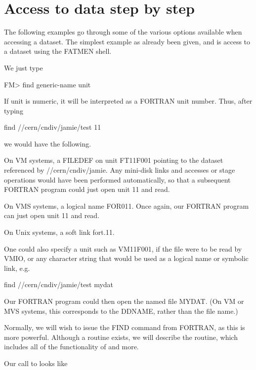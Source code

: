 \section{Access to data step by step}
\par
The following examples go through some of the various
options available when accessing a dataset.
The simplest example as already been given, and
is access to a dataset using the FATMEN shell.
\par
We just type
\begin{XMP}

FM> find generic-name unit

\end{XMP}
\par
If unit is numeric, it will be interpreted as a FORTRAN
unit number. Thus, after typing
\begin{XMP}

find //cern/cndiv/jamie/test 11

\end{XMP}
we would have the following.
\begin{UL}
\item
On VM systems, a FILEDEF on unit FT11F001 pointing to the
dataset referenced by //cern/cndiv/jamie. Any mini-disk
links and accesses or stage operations would have been
performed automatically, so that a subsequent FORTRAN
program could just open unit 11 and read.
\item
On VMS systems, a logical name FOR011. Once again,
our FORTRAN program can just open unit 11 and read.
\item
On Unix systems, a soft link fort.11.
\end{UL}
\par
One could also specify a unit such as VM11F001, if
the file were to be read by VMIO, or any character
string that would be used as a logical name or
symbolic link, e.g.
\begin{XMP}
find //cern/cndiv/jamie/test mydat
\end{XMP}
\par
Our FORTRAN program could then open the named file MYDAT.  
(On VM or MVS systems, this corresponds to the DDNAME, 
rather than the file name.) 
\par
Normally, we will wish to issue the FIND command from
FORTRAN, as this is more powerful. Although a routine
 exists, we will describe the  routine,
which includes all of the functionality of  and
more.
\par
Our call to  looks like
